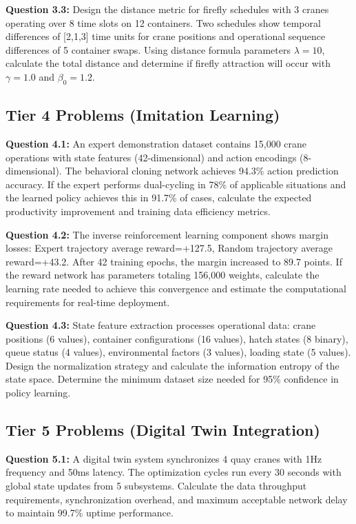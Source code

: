\documentclass{article}
\begin{document}
\textbf{Question 3.3:} Design the distance metric for firefly schedules with 3 cranes operating over 8 time slots on 12 containers. Two schedules show temporal differences of [2,1,3] time units for crane positions and operational sequence differences of 5 container swaps. Using distance formula parameters $\lambda=10$, calculate the total distance and determine if firefly attraction will occur with $\gamma=1.0$ and $\beta_0=1.2$.

\subsection{Tier 4 Problems (Imitation Learning)}

\textbf{Question 4.1:} An expert demonstration dataset contains 15,000 crane operations with state features (42-dimensional) and action encodings (8-dimensional). The behavioral cloning network achieves 94.3\% action prediction accuracy. If the expert performs dual-cycling in 78\% of applicable situations and the learned policy achieves this in 91.7\% of cases, calculate the expected productivity improvement and training data efficiency metrics.

\textbf{Question 4.2:} The inverse reinforcement learning component shows margin losses: Expert trajectory average reward=+127.5, Random trajectory average reward=+43.2. After 42 training epochs, the margin increased to 89.7 points. If the reward network has parameters totaling 156,000 weights, calculate the learning rate needed to achieve this convergence and estimate the computational requirements for real-time deployment.

\textbf{Question 4.3:} State feature extraction processes operational data: crane positions (6 values), container configurations (16 values), hatch states (8 binary), queue status (4 values), environmental factors (3 values), loading state (5 values). Design the normalization strategy and calculate the information entropy of the state space. Determine the minimum dataset size needed for 95\% confidence in policy learning.

\subsection{Tier 5 Problems (Digital Twin Integration)}

\textbf{Question 5.1:} A digital twin system synchronizes 4 quay cranes with 1Hz frequency and 50ms latency. The optimization cycles run every 30 seconds with global state updates from 5 subsystems. Calculate the data throughput requirements, synchronization overhead, and maximum acceptable network delay to maintain 99.7\% uptime performance.
\end{document}
